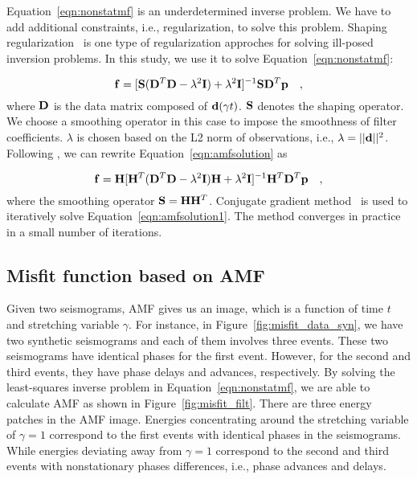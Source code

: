 Equation~\ref{eqn:nonstatmf} is an underdetermined inverse problem. 
We have to add additional constraints, i.e., regularization, to solve this problem. 
Shaping regularization~\citep{shaping2007} is one type of regularization approches for solving ill-posed 
inversion problems. In this study, we use it to solve Equation~\ref{eqn:nonstatmf}:

\begin{equation}
\label{eqn:amfsolution}
{\bf f}=[{\bf S}({\bf D}^T{\bf D}-\lambda^2{\bf I})+\lambda^2{\bf I}]^{-1}{\bf S}{\bf D}^T{\bf p}
\quad ,
\end{equation}
where ${\bf D}$ is the data matrix composed of ${\bf d}(\gamma t)$.
$\bf S$ denotes the shaping operator. We choose a smoothing operator in this case to impose 
the smoothness of filter coefficients.  $\lambda$ is chosen based on the L2 norm 
of observations, i.e., $\lambda=||{\bf d}||^2$. 
Following \cite{shaping2007}, we can rewrite Equation~\ref{eqn:amfsolution} as 

\begin{equation}
\label{eqn:amfsolution1}
{\bf f}={\bf H}[{\bf H}^T({\bf D}^T{\bf D}-\lambda^2{\bf I}){\bf H}+\lambda^2{\bf I}]^{-1}{\bf H}^T{\bf D}^T{\bf p}
\quad ,
\end{equation}
where the smoothing operator ${\bf S}={\bf H}{\bf H}^T$.
Conjugate gradient method~\citep{Fletcher1964} 
is used to iteratively solve Equation~\ref{eqn:amfsolution1}.
The method converges in practice in a small number of iterations.

\subsection{Misfit function based on AMF} 
Given two seismograms, AMF gives us an image, 
which is a function of time $t$ and stretching variable $\gamma$. 
For instance, in Figure~\ref{fig:misfit_data_syn}, we have two synthetic seismograms and each of them involves 
three events. These two seismograms have identical phases for the first event. However, 
for the second and third events, they have phase delays and advances, respectively.  
By solving the least-squares inverse problem in Equation~\ref{eqn:nonstatmf}, we are able to calculate 
AMF as shown in Figure~\ref{fig:misfit_filt}. There are three energy patches in the AMF image. 
Energies concentrating around the stretching variable of $\gamma=1$ correspond to the first events 
with identical phases in the seismograms. While energies deviating away from $\gamma=1$ correspond 
to the second and third events with nonstationary phases differences, i.e., phase advances and delays. 


